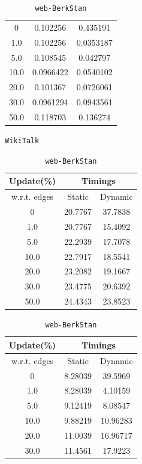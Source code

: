 \begin{table}[H]
{\begin{tabular}{|c|c|c|}
        \hline
        0 & 0.102256 & 0.435191 \\
        1.0 & 0.102256 & 0.0353187 \\
        5.0 & 0.108545 & 0.042797 \\
        10.0 & 0.0966422 & 0.0540102 \\
        20.0 & 0.101367 & 0.0726061 \\
        30.0 & 0.0961294 & 0.0943561 \\
        50.0 & 0.118703 & 0.136274 \\
        \hline
    \end{tabular}
}
\hfill
\parbox{0.45\linewidth}{
    \vspace{1.5em}
    \centering
    \caption{\texttt{WikiTalk}}
    \label{tab:WikiTalk}
    \begin{tabular}{|c|c|c|}
        \hline
        \textbf{Update(\%)} & \multicolumn{2}{c|}{\textbf{Timings}} \\
        \hline
        w.r.t. edges & Static &  Dynamic \\
        \hline
        0 & 20.7767 & 37.7838 \\
        1.0 & 20.7767 & 15.4092 \\
        5.0 & 22.2939 & 17.7078 \\
        10.0 & 22.7917 & 18.5541 \\
        20.0 & 23.2082 & 19.1667 \\
        30.0 & 23.4775 & 20.6392 \\
        50.0 & 24.4343 & 23.8523 \\
        \hline
    \end{tabular}
}
\hfill
\parbox{0.45\linewidth}{
    \vspace{1.5em}
    \centering
    \caption{\texttt{web-BerkStan}}
    \label{tab:web-BerkStan}
    \begin{tabular}{|c|c|c|}
        \hline
        \textbf{Update(\%)} & \multicolumn{2}{c|}{\textbf{Timings}} \\
        \hline
        w.r.t. edges & Static &  Dynamic \\
        \hline
        0 & 8.28039 & 39.5969 \\
        1.0 & 8.28039 & 4.10159 \\
        5.0 & 9.12419 & 8.08547 \\
        10.0 & 9.88219 & 10.96283 \\
        20.0 & 11.0039 & 16.96717 \\
        30.0 & 11.4561 & 17.9223 \\

\end{tabular}}
\end{table}
